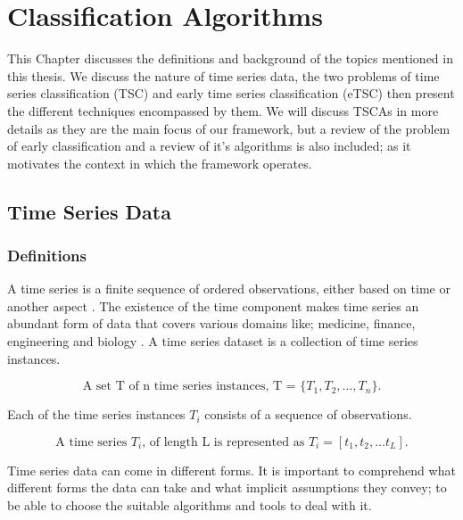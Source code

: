 \chapter{Classification Algorithms}
\label{ChapterClassificationAlgorithms}
This Chapter discusses the definitions and background of the topics mentioned in this thesis.
We discuss the nature of time series data, the two problems of time series classification (TSC) and early time series classification (eTSC) then present the different techniques encompassed by them.
We will discuss TSCAs in more details as they are the main focus of our framework, but a review of the problem of early classification and a review of it's algorithms is also included;
as it motivates the context in which the framework operates.

\section{Time Series Data}
\label{TimeSeriesData}

\subsection{Definitions}
\label{TSDefinitions}
A time series is a finite sequence of ordered observations, either based on time or another aspect \cite{abanda2019review,bagnall2017great}.
The existence of the time component makes time series an abundant form of data that covers various domains like; medicine, finance, engineering and biology \cite{lines2018time}.
A time series dataset is a collection of time series instances.
\begin{definition}
    \[ \textstyle \text{A set T of n time series instances, T = } \{T_{1}, T_{2}, \ldots ,T_{n}\}. \]
\end{definition}
Each of the time series instances $T_{i}$ consists of a sequence of observations.
\begin{definition}
    \[ \textstyle \text{A time series } T_{i} \text{, of length L is represented as } T_{i} = [t_{1}, t_{2}, \ldots t_{L}]. \]
\end{definition}
Time series data can come in different forms. It is important to comprehend what different forms the data can take and what implicit assumptions they convey; to be able to choose the suitable algorithms and tools to deal with it.

